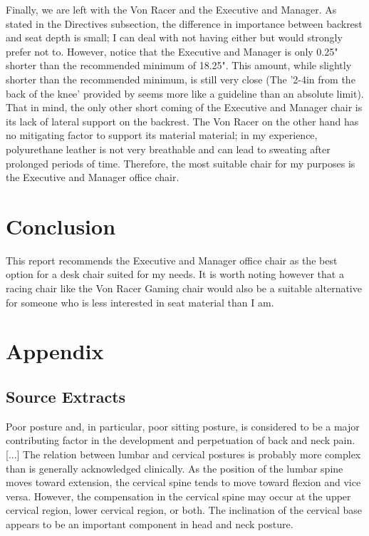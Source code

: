 \documentclass[11pt]{article}
\begin{document}
    Finally, we are left with the Von Racer and the Executive and Manager. As stated in the Directives subsection, the difference in importance between backrest and seat depth is small; I can deal with not having either but would strongly prefer not to. However, notice that the Executive and Manager is only 0.25" shorter than the recommended minimum of 18.25". This amount, while slightly shorter than the recommended minimum, is still very close (The '2-4in from the back of the knee' provided by \cite{howe_2016} seems more like a guideline than an absolute limit). That in mind, the only other short coming of the Executive and Manager chair is its lack of lateral support on the backrest. The Von Racer on the other hand has no mitigating factor to support its material material; in my experience, polyurethane leather is not very breathable and can lead to sweating after prolonged periods of time. Therefore, the most suitable chair for my purposes is the Executive and Manager office chair.

    \section{Conclusion}
    This report recommends the Executive and Manager office chair as the best option for a desk chair suited for my needs. It is worth noting however that a racing chair like the Von Racer Gaming chair would also be a suitable alternative for someone who is less interested in seat material than I am.

    \newpage
    \section{Appendix}
    \subsection{Source Extracts}
    \cite{black1996influence} Poor posture and, in particular, poor sitting posture, is considered to be a major contributing factor in the development and perpetuation of back and neck pain. [...] The relation between lumbar and cervical postures is probably more complex than is generally acknowledged clinically. As the position of the lumbar spine moves toward extension, the cervical spine tends to move toward flexion and vice versa. However, the compensation in the cervical spine may occur at the upper cervical region, lower cervical region, or both. The inclination of the cervical base appears to be an important component in head and neck posture. 
    
\end{document}
